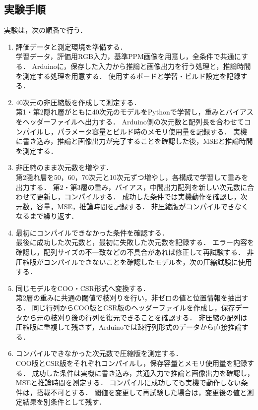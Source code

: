 \documentclass[a4paper,11pt]{article}
\begin{document}
\subsection{実験手順}
実験は，次の順番で行う．
\begin{enumerate}[label=\arabic*.,leftmargin=*,itemsep=6pt]
  \item 評価データと測定環境を準備する．\\
  学習データ，評価用RGB入力，基準PPM画像を用意し，全条件で共通にする．
  Arduinoに，保存した入力から推論と画像出力を行う処理と，推論時間を測定する処理を用意する．
  使用するボードと学習・ビルド設定を記録する．

  \item 40次元の非圧縮版を作成して測定する．\\
  第1・第2隠れ層がともに40次元のモデルをPythonで学習し，重みとバイアスをヘッダーファイルへ出力する．
  Arduino側の次元数と配列長を合わせてコンパイルし，パラメータ容量とビルド時のメモリ使用量を記録する．
  実機に書き込み，推論と画像出力が完了することを確認した後，MSEと推論時間を測定する．

  \item 非圧縮のまま次元数を増やす．\\
  第2隠れ層を50，60，70次元と10次元ずつ増やし，各構成で学習して重みを出力する．
  第2・第3層の重み，バイアス，中間出力配列を新しい次元数に合わせて更新し，コンパイルする．
  成功した条件では実機動作を確認し，次元数，容量，MSE，推論時間を記録する．
  非圧縮版がコンパイルできなくなるまで繰り返す．

  \item 最初にコンパイルできなかった条件を確認する．\\
  最後に成功した次元数と，最初に失敗した次元数を記録する．
  エラー内容を確認し，配列サイズの不一致などの不具合があれば修正して再試験する．
  非圧縮版がコンパイルできないことを確認したモデルを，次の圧縮試験に使用する．

  \item 同じモデルをCOO・CSR形式へ変換する．\\
  第2層の重みに共通の閾値で枝刈りを行い，非ゼロの値と位置情報を抽出する．
  同じ行列からCOO版とCSR版のヘッダーファイルを作成し，保存データから元の枝刈り後の行列を復元できることを確認する．
  非圧縮の配列は圧縮版に重複して残さず，Arduinoでは疎行列形式のデータから直接推論する．

  \item コンパイルできなかった次元数で圧縮版を測定する．\\
  COO版とCSR版をそれぞれコンパイルし，保存容量とメモリ使用量を記録する．
  成功した条件は実機に書き込み，共通入力で推論と画像出力を確認し，MSEと推論時間を測定する．
  コンパイルに成功しても実機で動作しない条件は，搭載不可とする．
  閾値を変更して再試験した場合は，変更後の値と測定結果を別条件として残す．


\end{enumerate}
\end{document}
